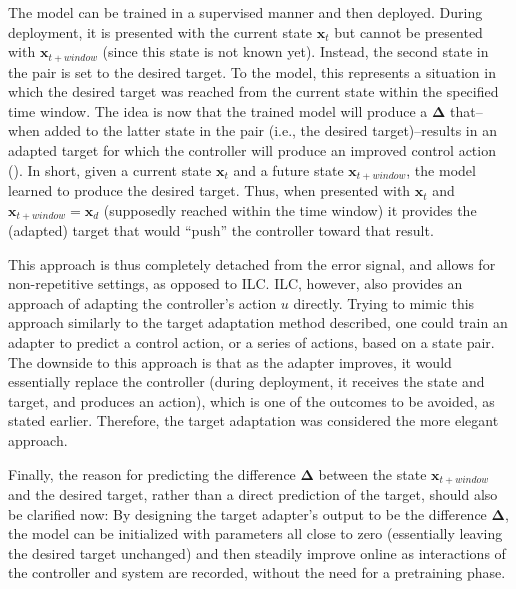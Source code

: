 The model can be trained in a supervised manner and then deployed.
During deployment, it is presented with the current state $\mathbf{x}_t$ but cannot be presented with $\mathbf{x}_{t+\textit{window}}$ (since this state is not known yet).
Instead, the second state in the pair is set to the desired target.
To the model, this represents a situation in which the desired target was reached from the current state within the specified time window.
The idea is now that the trained model will produce a $\bm{\Delta}$ that--when added to the latter state in the pair (i.e., the desired target)--results in an adapted target for which the controller will produce an improved control action ().
In short, given a current state $\mathbf{x}_t$ and a future state $\mathbf{x}_{t+\textit{window}}$, the model learned to produce the desired target.
Thus, when presented with $\mathbf{x}_t$ and $\mathbf{x}_{t+\textit{window}}=\mathbf{x}_d$ (supposedly reached within the time window) it provides the (adapted) target that would ``push'' the controller toward that result.

This approach is thus completely detached from the error signal, and allows for non-repetitive settings, as opposed to ILC.
ILC, however, also provides an approach of adapting the controller's action $u$ directly.
Trying to mimic this approach similarly to the target adaptation method described, one could train an adapter to predict a control action, or a series of actions, based on a state pair.
The downside to this approach is that as the adapter improves, it would essentially replace the controller (during deployment, it receives the state and target, and produces an action), which is one of the outcomes to be avoided, as stated earlier.
Therefore, the target adaptation was considered the more elegant approach.

Finally, the reason for predicting the difference $\bm{\Delta}$ between the state $\mathbf{x}_{t+\textit{window}}$ and the desired target, rather than a direct prediction of the target, should also be clarified now:
By designing the target adapter's output to be the difference $\bm{\Delta}$, the model can be initialized with parameters all close to zero (essentially leaving the desired target unchanged) and then steadily improve online as interactions of the controller and system are recorded, without the need for a pretraining phase.

